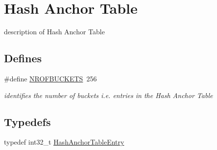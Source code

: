 \hypertarget{group___v_m_m___h_a_t}{
\section{Hash Anchor Table}
\label{group___v_m_m___h_a_t}
}
description of Hash Anchor Table  


\subsection*{Defines}
\begin{CompactItemize}
\item 
\hypertarget{group___v_m_m___h_a_t_g35a8dc8d1a8ad33e7cab49639b6a12a1}{
\#define \hyperlink{group___v_m_m___h_a_t_g35a8dc8d1a8ad33e7cab49639b6a12a1}{NROFBUCKETS}~256}
\label{group___v_m_m___h_a_t_g35a8dc8d1a8ad33e7cab49639b6a12a1}

\begin{CompactList}\small\item\em identifies the number of buckets i.e. entries in the Hash Anchor Table \item\end{CompactList}\end{CompactItemize}
\subsection*{Typedefs}
\begin{CompactItemize}
\item 
typedef int32\_\-t \hyperlink{group___v_m_m___h_a_t_g06b98a0b294446afee1b27a04682d7c2}{HashAnchorTableEntry}
\end{CompactItemize}
